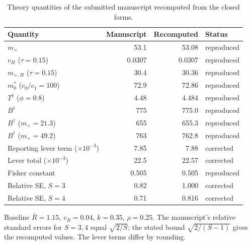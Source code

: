 \begin{table}[htbp]
\centering
\footnotesize
\caption{Theory quantities of the submitted manuscript recomputed from the closed forms.}
\label{tab:s7}
\begin{tabular}{lrrl}
\toprule
Quantity & Manuscript & Recomputed & Status \\
\midrule
$m_\times$ & 53.1 & 53.08 & reproduced \\
$v_H$ ($\tau=0.15$) & 0.0307 & 0.0307 & reproduced \\
$m_{\times,H}$ ($\tau=0.15$) & 30.4 & 30.36 & reproduced \\
$m_0^*$ ($c_0/c_1=100$) & 72.9 & 72.86 & reproduced \\
$T^\dagger$ ($\phi=0.8$) & 4.48 & 4.484 & reproduced \\
$B^\dagger$ & 775 & 775.0 & reproduced \\
$B^\dagger$ ($m_\times=21.3$) & 655 & 655.3 & reproduced \\
$B^\dagger$ ($m_\times=49.2$) & 763 & 762.8 & reproduced \\
Reporting lever term ($\times10^{-3}$) & 7.85 & 7.88 & corrected \\
Lever total ($\times10^{-3}$) & 22.5 & 22.57 & corrected \\
Fisher constant & 0.505 & 0.505 & reproduced \\
Relative SE, $S=3$ & 0.82 & 1.000 & corrected \\
Relative SE, $S=4$ & 0.71 & 0.816 & corrected \\
\bottomrule
\end{tabular}
\par\smallskip
\begin{minipage}{0.95\linewidth}\scriptsize Baseline $\bar{R}=1.15$, $v_R=0.04$, $k=0.35$, $\rho=0.25$. The manuscript's relative standard errors for $S=3,4$ equal $\sqrt{2/S}$; the stated bound $\sqrt{2/(S-1)}$ gives the recomputed values. The lever terms differ by rounding.\end{minipage}
\end{table}
